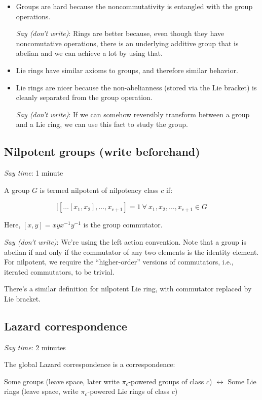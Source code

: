\documentclass[10pt]{amsart}
\begin{document}
\begin{itemize}
\item Groups are hard because the noncommutativity is entangled with
  the group operations.

  {\em Say (don't write)}: Rings are better because, even though they
  have noncomutative operations, there is an underlying additive group
  that is abelian and we can achieve a lot by using that.

\item Lie rings have similar axioms to groups, and therefore similar
  behavior.
\item Lie rings are nicer because the non-abelianness (stored via the
  Lie bracket) is cleanly separated from the group operation.

  {\em Say (don't write)}: If we can somehow reversibly transform
  between a group and a Lie ring, we can use this fact to study the
  group.
\end{itemize}

\subsection{Nilpotent groups (write beforehand)}

{\em Say time}: 1 minute

A group $G$ is termed nilpotent of nilpotency class $c$ if:

$$[[ \dots [x_1,x_2],\dots,x_{c+1}] = 1 \ \forall \ x_1,x_2,\dots,x_{c+1} \in G$$

Here, $[x,y] = xyx^{-1}y^{-1}$ is the group commutator. 

{\em Say (don't write)}: We're using the left action convention. Note
that a group is abelian if and only if the commutator of any two
elements is the identity element. For nilpotent, we require the
``higher-order'' versions of commutators, i.e., iterated commutators,
to be trivial.

There's a similar definition for nilpotent Lie ring, with commutator
replaced by Lie bracket.

\subsection{Lazard correspondence}

{\em Say time}: 2 minutes

The global Lazard correspondence is a correspondence:

Some groups (leave space, later write $\pi_c$-powered groups of class
$c$) $\leftrightarrow$ Some Lie rings (leave space, write
$\pi_c$-powered Lie rings of class $c$)
\end{document}
